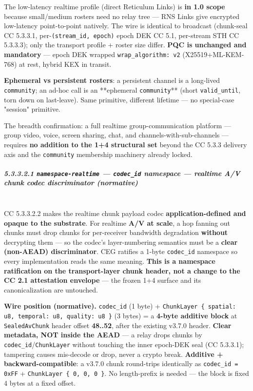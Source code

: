 \documentclass[11pt]{article}
\begin{document}
The low-latency realtime profile (direct Reticulum Links) is \textbf{in 1.0 scope} because small/medium rosters need no relay tree — RNS Links give encrypted low-latency point-to-point natively. The wire is identical to broadcast (chunk-seal CC 5.3.3.1, per-\texttt{(stream\_id, epoch)} epoch DEK CC 5.1, per-stream STH CC 5.3.3.3); only the transport profile + roster size differ. \textbf{PQC is unchanged and mandatory} — epoch DEK wrapped \texttt{wrap\_algorithm: v2} (X25519+ML-KEM-768) at rest, hybrid KEX in transit.


\textbf{Ephemeral vs persistent rosters}: a persistent channel is a long-lived \texttt{community}; an ad-hoc call is an **ephemeral \texttt{community}** (short \texttt{valid\_until}, torn down on last-leave). Same primitive, different lifetime — no special-case "session" primitive.


The breadth confirmation: a full realtime group-communication platform — group video, voice, screen sharing, chat, and channels-with-sub-channels — requires \textbf{no addition to the 1+4 structural set} beyond the CC 5.3.3 delivery axis and the \texttt{community} membership machinery already locked.


\subparagraph{5.3.3.2.1 \texttt{namespace-realtime} — \texttt{codec\_id} namespace — realtime A/V chunk codec discriminator (normative)}\mbox{}\\


CC 5.3.3.2.2 makes the realtime chunk payload codec \textbf{application-defined and opaque to the substrate}. For realtime \textbf{A/V at scale}, a hop fanning out chunks must drop chunks for per-receiver bandwidth degradation \textbf{without} decrypting them — so the codec's layer-numbering semantics must be a \textbf{clear (non-AEAD) discriminator}. CEG ratifies a 1-byte \texttt{codec\_id} namespace so every implementation reads the same meaning. \textbf{This is a namespace ratification on the transport-layer chunk header, not a change to the CC 2.1 attestation envelope} — the frozen 1+4 surface and its canonicalization are untouched.


\textbf{Wire position (normative).} \texttt{codec\_id} (1 byte) + \texttt{ChunkLayer \{ spatial: u8, temporal: u8, quality: u8 \}} (3 bytes) = a \textbf{4-byte additive block} at \texttt{SealedAvChunk} header offset \textbf{48..52}, after the existing v3.7.0 header. \textbf{Clear metadata, NOT inside the AEAD} — a relay drops chunks by \texttt{codec\_id}/\texttt{ChunkLayer} without touching the inner epoch-DEK seal (CC 5.3.3.1); tampering causes mis-decode or drop, never a crypto break. \textbf{Additive + backward-compatible}: a v3.7.0 chunk round-trips identically as \texttt{codec\_id = 0xFF} + \texttt{ChunkLayer \{ 0, 0, 0 \}}. No length-prefix is needed — the block is fixed 4 bytes at a fixed offset.
\end{document}
